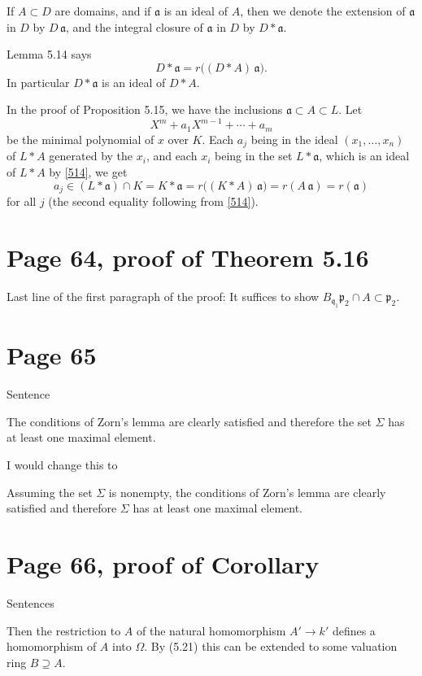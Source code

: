 \documentclass[12pt]{article}
\newcommand{\mf}{\mathfrak}
\begin{document}
If $A\subset D$ are domains, and if $\mf a$ is an ideal of $A$, then we denote the extension of $\mf a$ in $D$ by $D\,\mf a$, and the integral closure of $\mf a$ in $D$ by $D*\mf a$. 

Lemma 5.14 says
\begin{equation}\label{514}
D*\mf a=r\Big((D*A)\,\mf a\Big).
\end{equation}
In particular $D*\mf a$ is an ideal of $D*A$. 

In the proof of Proposition 5.15, we have the inclusions $\mf a\subset A\subset L$. Let 
$$
X^m+a_1X^{m-1}+\cdots+a_m
$$ 
be the minimal polynomial of $x$ over $K$. Each $a_j$ being in the ideal $(x_1,\dots,x_n)$ of $L*A$ generated by the $x_i$, and each $x_i$ being in the set $L*\mf a$, which is an ideal of $L*A$ by \eqref{514}, we get 
$$
a_j\in(L*\mf a)\cap K=K*\mf a=r\Big((K*A)\,\mf a\Big)=r(A\,\mf a)=r(\mf a)
$$ 
for all $j$ (the second equality following from \eqref{514}).

\section{Page 64, proof of Theorem 5.16}%

Last line of the first paragraph of the proof: It suffices to show $B_{\mf q_1}\mf p_2\cap A\subset\mf p_2$.

\section{Page 65}%

Sentence

The conditions of Zorn's lemma are clearly satisfied and therefore the set $\Sigma$ has at least one maximal element.

I would change this to 

Assuming the set $\Sigma$ is nonempty, the conditions of Zorn's lemma are clearly satisfied and therefore $\Sigma$ has at least one maximal element.

\section{Page 66, proof of Corollary}

Sentences

Then the restriction to $A$ of the natural homomorphism $A'\to k'$ defines a homomorphism of $A$ into $\Omega$. By (5.21) this can be extended to some valuation ring $B\supseteq A$.
\end{document}
